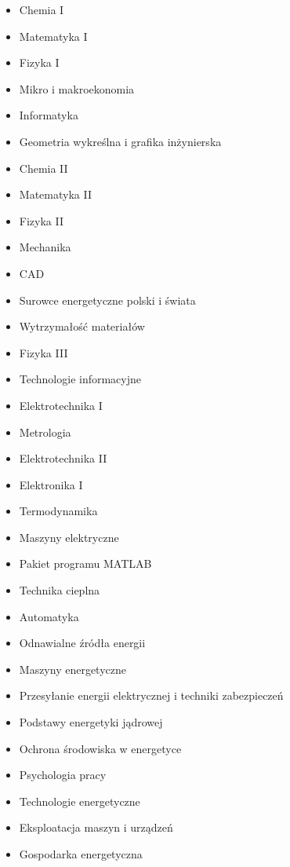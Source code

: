 \documentclass[a4paper,12pt]{article}
\begin{document}
\begin{multicols}{2}
\begin{itemize}
\item Chemia I
\item Matematyka I
\item Fizyka I
\item Mikro i makroekonomia 
\item Informatyka
\item Geometria wykreślna i grafika inżynierska
\item Chemia II
\item Matematyka II
\item Fizyka II
\item Mechanika
\item CAD
\item Surowce energetyczne polski i świata
\item Wytrzymałość materiałów
\item Fizyka III
\item Technologie informacyjne
\item Elektrotechnika I
\item Metrologia
\item Elektrotechnika II
\item Elektronika I
\item Termodynamika
\item Maszyny elektryczne
\item Pakiet programu MATLAB
\item Technika cieplna
\item Automatyka
\item Odnawialne źródła energii
\item Maszyny energetyczne
\item Przesyłanie energii elektrycznej i techniki zabezpieczeń
\item Podstawy energetyki jądrowej
\item Ochrona środowiska w energetyce
\item Psychologia pracy
\item Technologie energetyczne
\item Eksploatacja maszyn i urządzeń
\item Gospodarka energetyczna
\end{itemize}
\end{multicols}
\end{document}
